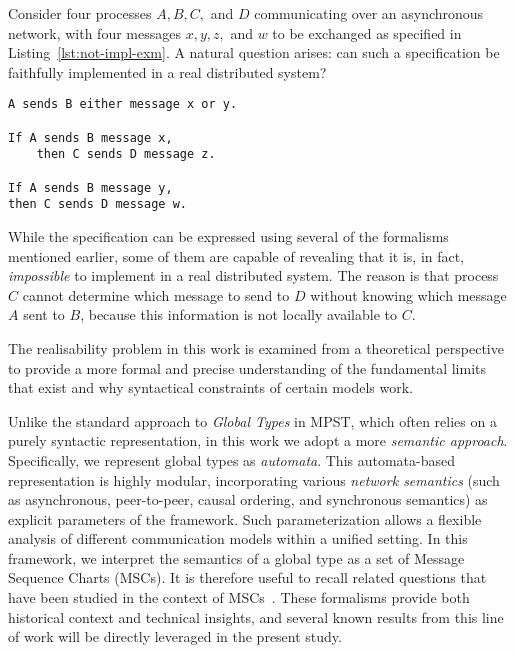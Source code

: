\begin{example}
Consider four processes $A, B, C,$ and $D$ communicating over an
asynchronous network, with four messages $x, y, z,$ and $w$ to be
exchanged as specified in Listing~\ref{lst:not-impl-exm}. A natural
question arises: can such a specification be faithfully implemented in a
real distributed system?

\bigskip

\begin{lstlisting}[caption={Example specification of message exchanges},
                   label={lst:not-impl-exm},
                   keywordstyle=\color{blue}\bfseries,morekeywords={sends,If,then}]
A sends B either message x or y.

If A sends B message x,
    then C sends D message z.

If A sends B message y,
then C sends D message w.
\end{lstlisting}

While the specification can be expressed using several of the formalisms
mentioned earlier, some of them are capable of revealing 
that it is, in fact, \emph{impossible} to implement in a real distributed system.
The reason is that process $C$ cannot determine which message to send
to $D$ without knowing which message $A$ sent to $B$, because this 
information is not locally available to $C$.
\end{example}

The realisability problem in this work is examined from a theoretical
perspective to provide a more formal and precise understanding of the
fundamental limits that exist and why syntactical constraints of certain
models work.  

Unlike the standard approach to \textit{Global Types} in MPST, which often
relies on a purely syntactic representation, in this work we adopt a more
\textit{semantic approach}. Specifically, we represent global types as
\textit{automata}. This automata-based
representation is highly modular, incorporating various
\textit{network semantics} (such as asynchronous, peer-to-peer, causal
ordering, and synchronous semantics) as explicit parameters of the
framework. Such parameterization allows a flexible analysis of different
communication models within a unified setting.
In this framework, we interpret the semantics of a global type as a set of
Message Sequence Charts (MSCs). It is therefore useful to recall related
questions that have been studied in the context of 
MSCs~\cite{alur2000inference,alur2003inference}. 
These formalisms provide both historical context and technical insights, 
and several known results from this line of work will be directly leveraged 
in the present study.

